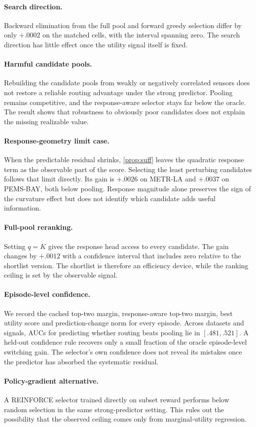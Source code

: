 \paragraph{Search direction.}
Backward elimination from the full pool and forward greedy selection differ by
only $+.0002$ on the matched cells, with the interval spanning zero. The search
direction has little effect once the utility signal itself is fixed.

\paragraph{Harmful candidate pools.}
Rebuilding the candidate pools from weakly or negatively correlated sensors does
not restore a reliable routing advantage under the strong predictor. Pooling
remains competitive, and the response-aware selector stays far below the oracle.
The result shows that robustness to obviously poor candidates does not explain
the missing realizable value.

\paragraph{Response-geometry limit case.}
When the predictable residual shrinks, \cref{prop:suff} leaves the quadratic
response term as the observable part of the score. Selecting the least
perturbing candidates follows that limit directly. Its gain is $+.0026$ on
METR-LA and $+.0037$ on PEMS-BAY, both below pooling. Response magnitude alone
preserves the sign of the curvature effect but does not identify which candidate
adds useful information.

\paragraph{Full-pool reranking.}
Setting $q=K$ gives the response head access to every candidate. The gain changes
by $+.0012$ with a confidence interval that includes zero relative to the
shortlist version. The shortlist is therefore an efficiency device, while the
ranking ceiling is set by the observable signal.

\paragraph{Episode-level confidence.}
We record the cached top-two margin, response-aware top-two margin, best utility
score and prediction-change norm for every episode. Across datasets and signals,
AUCs for predicting whether routing beats pooling lie in $[.481,.521]$. A
held-out confidence rule recovers only a small fraction of the oracle
episode-level switching gain. The selector's own confidence does not reveal its
mistakes once the predictor has absorbed the systematic residual.

\paragraph{Policy-gradient alternative.}
A REINFORCE selector trained directly on subset reward performs below random
selection in the same strong-predictor setting. This rules out the possibility
that the observed ceiling comes only from marginal-utility regression.
